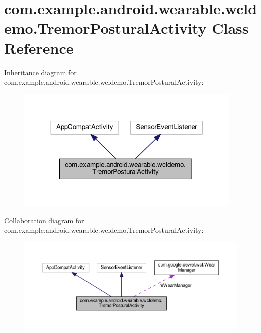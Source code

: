 \hypertarget{classcom_1_1example_1_1android_1_1wearable_1_1wcldemo_1_1TremorPosturalActivity}{}\section{com.\+example.\+android.\+wearable.\+wcldemo.\+Tremor\+Postural\+Activity Class Reference}
\label{classcom_1_1example_1_1android_1_1wearable_1_1wcldemo_1_1TremorPosturalActivity}


Inheritance diagram for com.\+example.\+android.\+wearable.\+wcldemo.\+Tremor\+Postural\+Activity\+:\nopagebreak
\begin{figure}[H]
\begin{center}
\leavevmode
\includegraphics[width=306pt]{da/d17/classcom_1_1example_1_1android_1_1wearable_1_1wcldemo_1_1TremorPosturalActivity__inherit__graph}
\end{center}
\end{figure}


Collaboration diagram for com.\+example.\+android.\+wearable.\+wcldemo.\+Tremor\+Postural\+Activity\+:\nopagebreak
\begin{figure}[H]
\begin{center}
\leavevmode
\includegraphics[width=350pt]{d0/d0c/classcom_1_1example_1_1android_1_1wearable_1_1wcldemo_1_1TremorPosturalActivity__coll__graph}
\end{center}
\end{figure}
